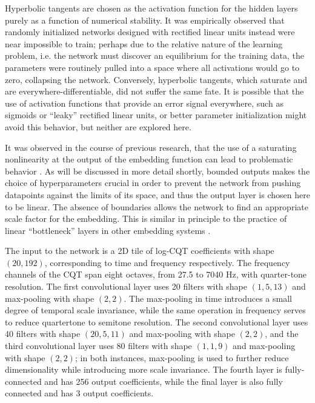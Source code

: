 Hyperbolic tangents are chosen as the activation function for the hidden layers purely as a function of numerical stability.
It was empirically observed that randomly initialized networks designed with rectified linear units instead were near impossible to train; perhaps due to the relative nature of the learning problem, i.e. the network must discover an equilibrium for the training data, the parameters were routinely pulled into a space where all activations would go to zero, collapsing the network.
Conversely, hyperbolic tangents, which saturate and are everywhere-differentiable, did not suffer the same fate.
It is possible that the use of activation functions that provide an error signal everywhere, such as sigmoids or ``leaky'' rectified linear units, or better parameter initialization might avoid this behavior, but neither are explored here.

It was observed in the course of previous research, that the use of a saturating nonlinearity at the output of the embedding function can lead to problematic behavior \cite{Humphrey2011Nonlinear}.
As will be discussed in more detail shortly, bounded outputs makes the choice of hyperparameters crucial in order to prevent the network from pushing datapoints against the limits of its space, and thus the output layer is chosen here to be linear.
The absence of boundaries allows the network to find an appropriate scale factor for the embedding.
This is similar in principle to the practice of linear ``bottleneck'' layers  in other embedding systems \cite{Yu2011Improved}.

The input to the network is a 2D tile of log-CQT coefficients with shape $(20, 192)$, corresponding to time and frequency respectively.
The frequency channels of the CQT span eight octaves, from 27.5 to 7040 Hz, with quarter-tone resolution.
The first convolutional layer uses 20 filters with shape $(1, 5, 13)$ and max-pooling with shape $(2, 2)$.
The max-pooling in time introduces a small degree of temporal scale invariance, while the same operation in frequency serves to reduce quartertone to semitone resolution.
The second convolutional layer uses 40 filters with shape $(20, 5, 11)$ and max-pooling with shape $(2, 2)$, and the third convolutional layer uses 80 filters with shape $(1, 1, 9)$ and max-pooling with shape $(2, 2)$;
in both instances, max-pooling is used to further reduce dimensionality while introducing more scale invariance.
The fourth layer is fully-connected and has 256 output coefficients, while the final layer is also fully connected and has 3 output coefficients.


